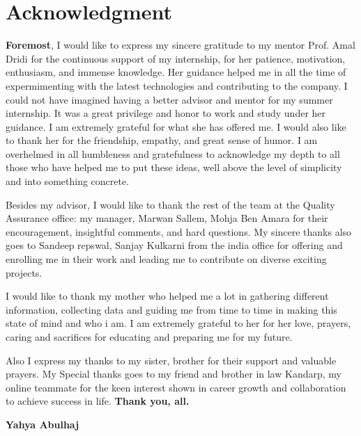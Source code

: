 

\chapter*{Acknowledgment}
\newline

\textbf{Foremost}, I would like to express my sincere gratitude to my mentor Prof. Amal Dridi for the continuous support of my internship, for her patience, motivation, enthusiasm, and immense knowledge. \newline Her guidance helped me in all the time of expermimenting with the latest technologies and contributing to the company.
I could not have imagined having a better advisor and mentor for my summer internship.
\newline
It was a great privilege and honor to work and study under her guidance. I am extremely
grateful for what she has offered me. I would also like to thank her for the
friendship, empathy, and great sense of humor. 
\newline
I am overhelmed in all humbleness and gratefulness to acknowledge my depth to all those who have helped me to put these ideas, well above the level of simplicity and into something concrete.
\newline

Besides my advisor, I would like to thank the rest of the team at the Quality Assurance office: my manager, Marwan Sallem, Mohja Ben Amara for their encouragement, insightful comments, and hard questions.\newline
My sincere thanks also goes to Sandeep repswal, Sanjay Kulkarni from the india office for offering and enrolling me in their work and leading me to contribute on diverse exciting projects.
\newline

I would like to thank my mother who helped me a lot in gathering different information, collecting data and guiding me from time to time in making this state of mind and who i am. I am extremely grateful to her for her love, prayers, caring and
sacrifices for educating and preparing me for my future.
\newline

Also I express my thanks to my sister,
brother for their support and valuable prayers. My
Special thanks goes to my friend and brother in law Kandarp, my online teammate for the
keen interest shown in career growth and collaboration to achieve success in life.
\newline
\textbf{Thank you, all.}
\vskip1.5cm
\begin{flushright}\LARGE
\bf{Yahya Abulhaj}
\end{flushright}
